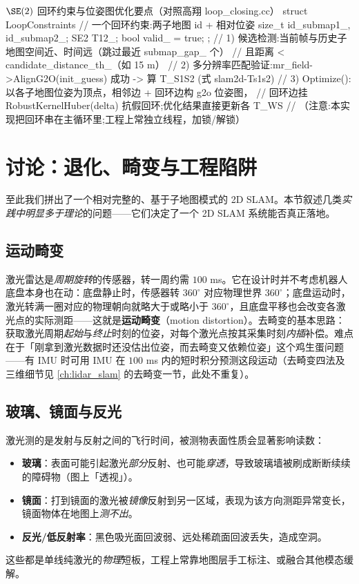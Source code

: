 \begin{codebox}[C++]{$\SE(2)$ 回环约束与位姿图优化要点（对照高翔 loop\_closing.cc）}
struct LoopConstraints {                 // 一个回环约束:两子地图 id + 相对位姿
  size_t id_submap1_, id_submap2_;  SE2 T12_;  bool valid_ = true;
};
// 1) 候选检测:当前帧与历史子地图空间近、时间远（跳过最近 submap_gap_ 个）
//    且距离 < candidate_distance_th_（如 15 m）
// 2) 多分辨率匹配验证:mr_field->AlignG2O(init_guess) 成功 -> 算 T_S1S2 (式 slam2d-Ts1s2)
// 3) Optimize():以各子地图位姿为顶点，相邻边 + 回环边构 g2o 位姿图，
//    回环边挂 RobustKernelHuber(delta) 抗假回环;优化结果直接更新各 T_WS
//    （注意:本实现把回环串在主循环里;工程上常独立线程，加锁/解锁）
\end{codebox}

\section{讨论：退化、畸变与工程陷阱}
\label{sec:slam2d-discuss}

至此我们拼出了一个相对完整的、基于子地图模式的 2D SLAM。本节叙述几类\emph{实践中明显多于理论}的问题——它们决定了一个 2D SLAM 系统能否真正落地。

\subsection{运动畸变}
\label{sec:slam2d-distortion}

激光雷达是\emph{周期旋转}的传感器，转一周约需 $100$ ms。它在设计时并不考虑机器人底盘本身也在动：底盘静止时，传感器转 $360^\circ$ 对应物理世界 $360^\circ$；底盘运动时，激光转满一圈对应的物理朝向就略大于或略小于 $360^\circ$，且底盘平移也会改变各激光点的实际测距——这就是\textbf{运动畸变}（motion distortion）。去畸变的基本思路：获取激光周期\emph{起始}与\emph{终止}时刻的位姿，对每个激光点按其采集时刻\emph{内插}补偿。难点在于「刚拿到激光数据时还没估出位姿，而去畸变又依赖位姿」这个鸡生蛋问题——有 IMU 时可用 IMU 在 $100$ ms 内的短时积分预测这段运动（去畸变四法及三维细节见 \cref{ch:lidar_slam} 的去畸变一节，此处不重复）。

\subsection{玻璃、镜面与反光}
\label{sec:slam2d-glass}

激光测的是发射与反射之间的飞行时间，被测物表面性质会显著影响读数：
\begin{itemize}
  \item \textbf{玻璃}：表面可能引起激光\emph{部分}反射、也可能\emph{穿透}，导致玻璃墙被刷成断断续续的障碍物（图上「透视」）。
  \item \textbf{镜面}：打到镜面的激光被\emph{镜像}反射到另一区域，表现为该方向测距异常变长，镜面物体在地图上\emph{测不出}。
  \item \textbf{反光/低反射率}：黑色吸光面回波弱、远处稀疏面回波丢失，造成空洞。
\end{itemize}
这些都是单线纯激光的\emph{物理}短板，工程上常靠地图层手工标注、或融合其他模态缓解。

